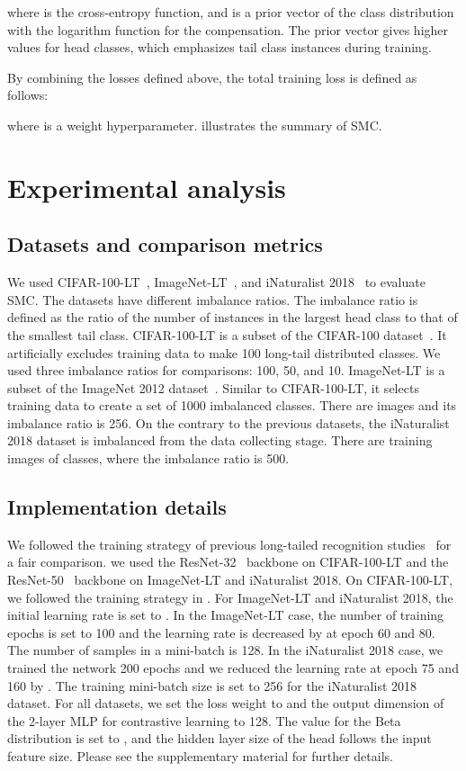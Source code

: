 \documentclass[10pt,twocolumn,letterpaper]{article}
\begin{document}
where  is the cross-entropy function, and  is a prior vector of the class distribution  with the logarithm function for the compensation.
The prior vector gives higher values for head classes, which emphasizes tail class instances during training.

By combining the losses defined above, the total training loss is defined as follows:

where  is a weight hyperparameter.
 illustrates the summary of SMC.


\section{Experimental analysis}
\label{sec:experiments}

\subsection{Datasets and comparison metrics}
We used CIFAR-100-LT~\cite{CIFAR-LT}, ImageNet-LT~\cite{ImageNet-LT}, and iNaturalist 2018~\cite{iNaturalist} to evaluate SMC. The datasets have different imbalance ratios. The imbalance ratio  is defined as the ratio of the number of instances in the largest head class to that of the smallest tail class.
CIFAR-100-LT is a subset of the CIFAR-100 dataset~\cite{CIFAR}. It artificially excludes training data to make 100 long-tail distributed classes. We used three imbalance ratios for comparisons: 100, 50, and 10.
ImageNet-LT is a subset of the ImageNet 2012 dataset~\cite{ImageNet}. Similar to CIFAR-100-LT, it selects training data to create a set of 1000 imbalanced classes. There are  images and its imbalance ratio is 256.
On the contrary to the previous datasets, the iNaturalist 2018 dataset is imbalanced from the data collecting stage.
There are  training images of  classes, where the imbalance ratio is 500.

\subsection{Implementation details}
We followed the training strategy of previous long-tailed recognition studies~\cite{KCL, TSC, CMO} for a fair comparison. we used the ResNet-32~\cite{resnet} backbone on CIFAR-100-LT and the ResNet-50~\cite{resnet} backbone on ImageNet-LT and iNaturalist 2018.
On CIFAR-100-LT, we followed the training strategy in \cite{cao2019learning}.
For ImageNet-LT and iNaturalist 2018, the initial learning rate is set to . In the ImageNet-LT case, the number of training epochs is set to 100 and the learning rate is decreased by  at epoch 60 and 80. The number of samples in a mini-batch is 128.
In the iNaturalist 2018 case, we trained the network 200 epochs and we reduced the learning rate at epoch 75 and 160 by .
The training mini-batch size is set to 256 for the iNaturalist 2018 dataset.
For all datasets, we set the loss weight  to  and the output dimension of the 2-layer MLP for contrastive learning to 128. The  value for the Beta distribution is set to , and the hidden layer size of the head follows the input feature size.
Please see the supplementary material for further details.
\end{document}
